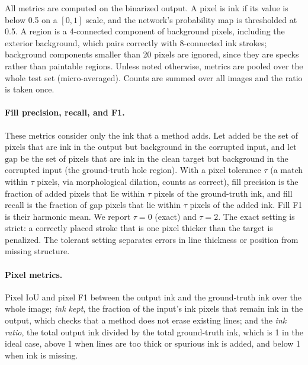 \documentclass[11pt]{article}
\begin{document}
All metrics are computed on the binarized output. A pixel is ink if its value is
below 0.5 on a $[0,1]$ scale, and the network's probability map is thresholded at
0.5. A region is a 4-connected component of background pixels, including the exterior
background, which pairs correctly
with 8-connected ink strokes; background components smaller than 20 pixels are
ignored, since they are specks rather than paintable regions. Unless
noted otherwise, metrics are pooled over the whole test set (micro-averaged). Counts
are summed over all images and the ratio is taken once.

\paragraph{Fill precision, recall, and F1.} These metrics consider only the ink that
a method adds. Let $\text{added}$ be the set of pixels that are ink in the output but
background in the corrupted input, and let $\text{gap}$ be the set of pixels that are
ink in the clean target but background in the corrupted input (the ground-truth hole
region). With a pixel tolerance $\tau$ (a match within $\tau$ pixels, via
morphological dilation, counts as correct), fill precision is the fraction of added
pixels that lie within $\tau$ pixels of the ground-truth ink, and fill recall is the
fraction of gap pixels that lie within $\tau$ pixels of the added ink. Fill F1 is
their harmonic mean. We report $\tau = 0$ (exact) and $\tau = 2$. The exact setting
is strict: a correctly placed stroke that is one pixel thicker than the target is
penalized. The tolerant setting separates errors in line thickness or position from
missing structure.

\paragraph{Pixel metrics.} Pixel IoU and pixel F1 between the output ink and the
ground-truth ink over the whole image; \emph{ink kept}, the fraction of the input's
ink pixels that remain ink in the output, which checks that a method does not erase
existing lines; and the \emph{ink ratio}, the total output ink divided by the total
ground-truth ink, which is 1 in the ideal case, above 1 when lines are too thick or
spurious ink is added, and below 1 when ink is missing.
\end{document}
